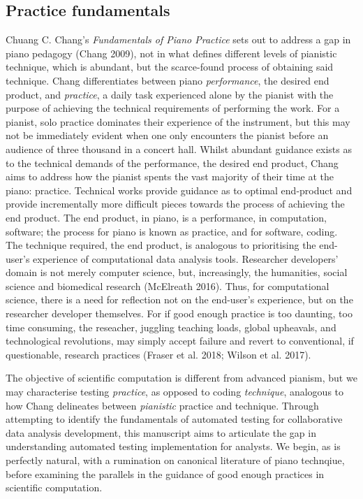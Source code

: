 \documentclass[
]{article}
\begin{document}
\hypertarget{practice-fundamentals}{%
\subsection{Practice fundamentals}\label{practice-fundamentals}}

Chuang C. Chang's \emph{Fundamentals of Piano Practice} sets out to address a gap in piano pedagogy (Chang 2009), not in what defines different levels of pianistic technique, which is abundant, but the scarce-found process of obtaining said technique. Chang differentiates between piano \emph{performance}, the desired end product, and \emph{practice}, a daily task experienced alone by the pianist with the purpose of achieving the technical requirements of performing the work. For a pianist, solo practice dominates their experience of the instrument, but this may not be immediately evident when one only encounters the pianist before an audience of three thousand in a concert hall. Whilst abundant guidance exists as to the technical demands of the performance, the desired end product, Chang aims to address how the pianist spents the vast majority of their time at the piano: practice. Technical works provide guidance as to optimal end-product and provide incrementally more difficult pieces towards the process of achieving the end product. The end product, in piano, is a performance, in computation, software; the process for piano is known as practice, and for software, coding.\\
The technique required, the end product, is analogous to prioritising the end-user's experience of computational data analysis tools. Researcher developers' domain is not merely computer science, but, increasingly, the humanities, social science and biomedical research (McElreath 2016). Thus, for computational science, there is a need for reflection not on the end-user's experience, but on the researcher developer themselves. For if good enough practice is too daunting, too time consuming, the reseacher, juggling teaching loads, global upheavals, and technological revolutions, may simply accept failure and revert to conventional, if questionable, research practices (Fraser et al. 2018; Wilson et al. 2017).

The objective of scientific computation is different from advanced pianism, but we may characterise testing \emph{practice}, as opposed to coding \emph{technique}, analogous to how Chang delineates between \emph{pianistic} practice and technique. Through attempting to identify the fundamentals of automated testing for collaborative data analysis development, this manuscript aims to articulate the gap in understanding automated testing implementation for analysts. We begin, as is perfectly natural, with a rumination on canonical literature of piano technqiue, before examining the parallels in the guidance of good enough practices in scientific computation.
\end{document}
